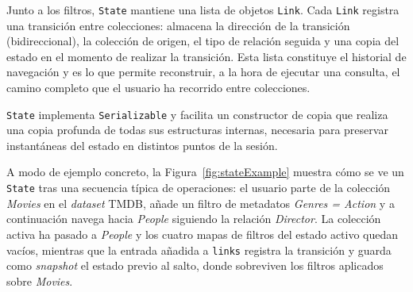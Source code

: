 Junto a los filtros, \texttt{State} mantiene una lista de objetos \texttt{Link}. Cada
\texttt{Link} registra una transición entre colecciones: almacena la dirección de la transición
(bidireccional), la colección de origen, el tipo de relación seguida y una copia
del estado en el momento de realizar la transición. Esta lista constituye el historial de
navegación y es lo que permite reconstruir, a la hora de ejecutar una consulta, el camino
completo que el usuario ha recorrido entre colecciones.

\texttt{State} implementa \texttt{Serializable} y facilita un constructor de copia que realiza
una copia profunda de todas sus estructuras internas, necesaria para preservar instantáneas
del estado en distintos puntos de la sesión.

A modo de ejemplo concreto, la Figura~\ref{fig:stateExample} muestra
cómo se ve un \texttt{State} tras una secuencia típica de operaciones:
el usuario parte de la colección \textit{Movies} en el \textit{dataset} TMDB,
añade un filtro de metadatos \textit{Genres = Action} y a continuación
navega hacia \textit{People} siguiendo la relación \textit{Director}.
La colección activa ha pasado a \textit{People} y los cuatro mapas de filtros del estado activo
quedan vacíos, mientras que la entrada añadida a \texttt{links} registra la transición y guarda como
\textit{snapshot} el estado previo al salto, donde sobreviven los filtros aplicados sobre \textit{Movies}.

